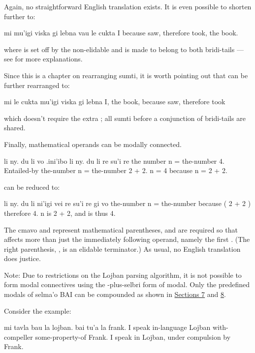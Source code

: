 Again, no straightforward English translation exists. It is
    even possible to shorten 
    further to:
\begin{example}
mi mu'igi viska gi lebna vau le cukta\n
I because saw, therefore took, the book.
\end{example}

{\noindent}where  is set off by the non-elidable  and
    is made to belong to both bridi-tails --- see  for more explanations. 

Since this is a chapter on rearranging sumti, it is worth
    pointing out that  can be
    further rearranged to:
\begin{example}
mi le cukta mu'igi viska gi lebna\n
I, the book, because saw, therefore took
\end{example}

{\noindent}which doesn't require the extra ; all sumti before a
    conjunction of bridi-tails are shared. 

Finally, mathematical operands can be modally connected.
\begin{example}
li ny. du li vo\n
\T	.ini'ibo li ny. du li re su'i re\n
the number n = the-number 4.\n
\T	Entailed-by the-number n = the-number 2 + 2.\n
n = 4 because n = 2 + 2.
\end{example}

{\noindent}can be reduced to:
\begin{example}
li ny. du li\n
\T	ni'igi vei re su'i re  gi vo\n
the-number n = the-number\n
\T	because ( 2 + 2 ) therefore 4.\n
n is 2 + 2, and is thus 4.
\end{example}

The cmavo  and  represent mathematical
    parentheses, and are required so that  affects more
    than just the immediately following operand, namely the first
    . (The right parenthesis, , is an elidable
    terminator.) As usual, no English translation does  justice. 

Note: Due to restrictions on the Lojban parsing algorithm,
    it is not possible to form modal connectives using the
    -plus-selbri form of modal. Only the predefined modals
    of selma'o BAI can be compounded as shown in \hyperref[sec:9:7]{Sections 7} and \hyperref[sec:9:8]{8}.



Consider the example:
\begin{example}
mi tavla bau la lojban.\n
\T	bai tu'a la frank.\n
I speak in-language Lojban\n
\T	with-compeller some-property-of Frank.\n
I speak in Lojban, under compulsion by Frank.
\end{example}

